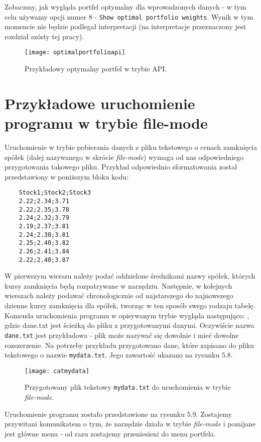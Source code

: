 \documentclass[magister]{dyplom}
\def\code#1{\texttt{#1}}
\begin{document}
Zobaczmy, jak wygląda portfel optymalny dla wprowadzonych danych - w tym celu używamy opcji numer 8 - \code{Show optimal portfolio weights}. Wynik w tym momencie nie będzie podlegał interpretacji (na interpretacje przeznaczony jest rozdział szósty tej pracy).

\begin{figure}[ht]
	\centering
	\texttt{[image: optimalportfolioapi]}
	\caption{Przykładowy optymalny portfel w trybie API.}
\end{figure}


\section{Przykładowe uruchomienie programu w trybie file-mode}

Uruchomienie w trybie pobierania danych z pliku tekstowego o cenach zamknięcia spółek (dalej nazywanego w skrócie \textit{file-mode}) wymaga od nas odpowiedniego przygotowania takowego pliku. Przykład odpowiednio sformatowania został przedstawiony w poniższym bloku kodu:
\newpage
\begin{verbatim}
	Stock1;Stock2;Stock3
	2.22;2.34;3.71
	2.22;2.35;3.78
	2.24;2.32;3.79
	2.19;2.37;3.81
	2.24;2.38;3.81
	2.25;2.40;3.82
	2.26;2.41;3.84
	2.22;2.40;3.87
\end{verbatim}
W pierwszym wierszu należy podać oddzielone średnikami nazwy spółek, których kursy zamknięcia będą rozpatrywane w narzędziu. Następnie, w kolejnych wierszach należy podawać chronologicznie od najstarszego do najnowszego dzienne kursy zamknięcia dla spółek, tworząc w ten sposób swego rodzaju tabelę. Komenda uruchomienia programu w opisywanym trybie wygląda następująco:
,
gdzie dane.txt jest ścieżką do pliku z przygotowanymi danymi. Oczywiście nazwa \code{dane.txt} jest przykładowa - plik może nazywać się dowolnie i mieć dowolne rozszerzenie.
Na potrzeby przykładu przygotowano dane, które zapisano do pliku tekstowego o nazwie \code{mydata.txt}. Jego zawartość ukazano na rysunku 5.8. 

\begin{figure}[ht!]
	\centering
	\texttt{[image: catmydata]}
	\caption{Przygotowany plik tekstowy \code{mydata.txt} do uruchomienia w trybie \textit{file-mode}.}
\end{figure}

Uruchomienie programu zostało przedstawione na rysunku 5.9. Zostajemy przywitani komunikatem o tym, że narzędzie działa w trybie \textit{file-mode} i pomijane jest główne menu - od razu zostajemy przeniesieni do menu portfela.
\end{document}
